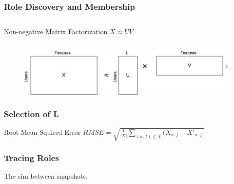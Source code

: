 \begin{frame}
\frametitle{Role Discovery and Membership}

\begin{columns}
	\begin{column}{0.5\textwidth}
		\begin{block}{\small Non-negative Matrix Factorization}
			$X \approx UV$
		\end{block}
	\end{column}
	\begin{column}{0.5\textwidth}
	\end{column}
\end{columns}
\begin{figure}
\includegraphics[scale=.3]{graphics/nmf}
\end{figure}

\end{frame}

\begin{frame}
\frametitle{Selection of L}
\begin{block}{\small Root Mean Squired Error}
$RMSE = \sqrt{\frac{1}{|X|} \sum\limits_{(u,f) \in X}(X_{u,f}-X'_{u,f)}}$
\end{block}

\end{frame}

\begin{frame}
\frametitle{Tracing Roles}
The sim between snapshots. 
\end{frame}